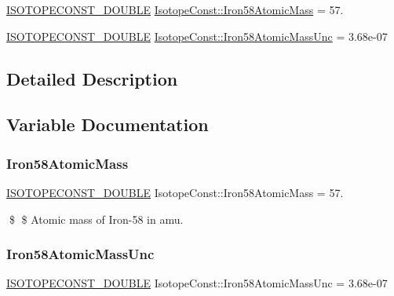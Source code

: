 \begin{DoxyCompactItemize}
\item 
\mbox{\hyperlink{group___isotope_const-_macros_ga8f45a7272ce02c0b4c65c44636ed719a}{I\+S\+O\+T\+O\+P\+E\+C\+O\+N\+S\+T\+\_\+\+D\+O\+U\+B\+LE}} \mbox{\hyperlink{group___isotope_const-_iron-_fe58_gac2872f8d5f96a1622955455e2a86262a}{Isotope\+Const\+::\+Iron58\+Atomic\+Mass}} = 57.
\item 
\mbox{\hyperlink{group___isotope_const-_macros_ga8f45a7272ce02c0b4c65c44636ed719a}{I\+S\+O\+T\+O\+P\+E\+C\+O\+N\+S\+T\+\_\+\+D\+O\+U\+B\+LE}} \mbox{\hyperlink{group___isotope_const-_iron-_fe58_ga91a405a460e9b91d035eb1e006a5ba5d}{Isotope\+Const\+::\+Iron58\+Atomic\+Mass\+Unc}} = 3.\+68e-\/07
\end{DoxyCompactItemize}


\subsection{Detailed Description}


\subsection{Variable Documentation}
\mbox{\label{group___isotope_const-_iron-_fe58_gac2872f8d5f96a1622955455e2a86262a}} 
\subsubsection{\texorpdfstring{Iron58\+Atomic\+Mass}{Iron58AtomicMass}}
{\footnotesize\ttfamily \mbox{\hyperlink{group___isotope_const-_macros_ga8f45a7272ce02c0b4c65c44636ed719a}{I\+S\+O\+T\+O\+P\+E\+C\+O\+N\+S\+T\+\_\+\+D\+O\+U\+B\+LE}} Isotope\+Const\+::\+Iron58\+Atomic\+Mass = 57.}

\$ \$ Atomic mass of Iron-\/58 in amu. \mbox{\label{group___isotope_const-_iron-_fe58_ga91a405a460e9b91d035eb1e006a5ba5d}} 
\subsubsection{\texorpdfstring{Iron58\+Atomic\+Mass\+Unc}{Iron58AtomicMassUnc}}
{\footnotesize\ttfamily \mbox{\hyperlink{group___isotope_const-_macros_ga8f45a7272ce02c0b4c65c44636ed719a}{I\+S\+O\+T\+O\+P\+E\+C\+O\+N\+S\+T\+\_\+\+D\+O\+U\+B\+LE}} Isotope\+Const\+::\+Iron58\+Atomic\+Mass\+Unc = 3.\+68e-\/07}

